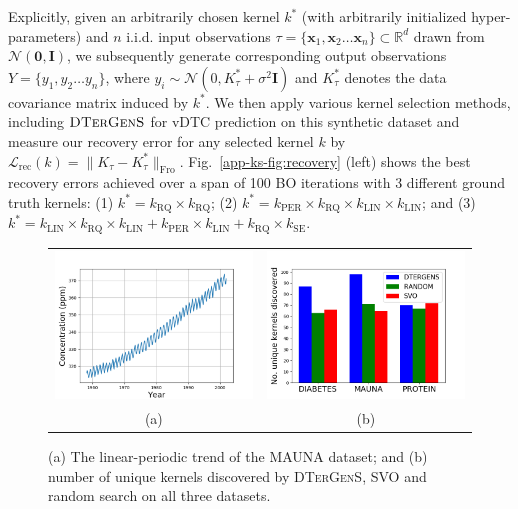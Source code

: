 Explicitly, given an arbitrarily chosen kernel $k^{\ast}$ (with arbitrarily initialized hyper-parameters) and $n$ i.i.d. input observations $\tau = \{\mathbf{x}_1, \mathbf{x}_2 \dots \mathbf{x}_n\} \subset \mathbb{R}^d$ drawn from $\mathcal{N}(\mathbf{0}, \mathbf{I})$, we subsequently generate corresponding output observations $Y = \{y_1, y_2 \dots y_n\}$, where $y_i \sim \mathcal{N}(0, K^{\ast}_\tau + \sigma^2\mathbf{I})$ and $K^{\ast}_\tau$ denotes the data covariance matrix induced by $k^{\ast}$. We then apply various kernel selection methods, including $\textsc{DTerGenS}$ for vDTC prediction on this synthetic dataset and measure our recovery error for any selected kernel $k$ by $\mathcal{L}_{\mathrm{rec}}(k) = \|K_\tau - K^{\ast}_\tau\|_{\mathrm{Fro}}$. Fig.~\ref{app-ks-fig:recovery} (left) shows the best recovery errors achieved over a span of 100 BO iterations with 3 different ground truth kernels: (1) $k^\ast = k_\mathrm{RQ}\times k_\mathrm{RQ}$; (2) $k^\ast = k_\mathrm{PER}\times k_\mathrm{RQ}\times k_\mathrm{LIN}\times k_\mathrm{LIN}$; and (3) $k^\ast = k_\mathrm{LIN}\times k_\mathrm{RQ}\times k_\mathrm{LIN} + k_\mathrm{PER}\times k_\mathrm{LIN} + k_\mathrm{RQ}\times k_\mathrm{SE}$. 
\begin{figure}
\begin{tabular}{cc}
\includegraphics[width=0.48\columnwidth]{./kernel_plots/mauna_visual.png} & \includegraphics[width=0.48\columnwidth]{./kernel_plots/unique_k.png} \\
(a) & (b)
\end{tabular}
\caption{(a) The linear-periodic trend of the MAUNA dataset; and (b) number of unique kernels discovered by \textsc{DTerGenS}, \textsc{SVO} and random search on all three datasets.}
\label{app-ks-fig:visual}
\end{figure}

